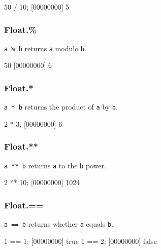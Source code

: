 \begin{urbiscript}
50 / 10;
[00000000] 5
\end{urbiscript}

\subsubsection{Float.\%}

\lstinline|a % b|
returns \lstinline|a| modulo \lstinline|b|.

\begin{urbiscript}
50 %
[00000000] 6
\end{urbiscript}

\subsubsection{Float.*}

\lstinline|a * b| returns the product of \lstinline|a| by
\lstinline|b|.

\begin{urbiscript}
2 * 3;
[00000000] 6
\end{urbiscript}

\subsubsection{Float.**}

\lstinline|a ** b| returns \lstinline|a| to the \lstinline|b| power.

\begin{urbiscript}
2 ** 10;
[00000000] 1024
\end{urbiscript}

\subsubsection{Float.==}

\lstinline|a == b| returns whether \lstinline|a| equals \lstinline|b|.

\begin{urbiscript}
1 == 1;
[00000000] true
1 == 2;
[00000000] false
\end{urbiscript}


